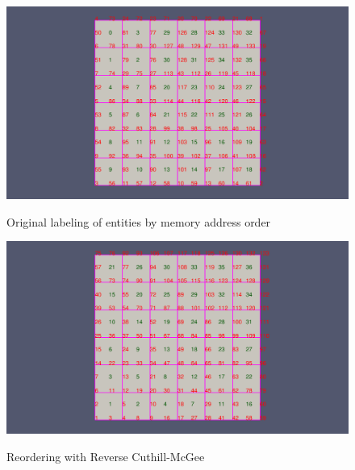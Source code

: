 \documentclass{article}
\begin{document}
\begin{figure}[h]
\caption{Original labeling of entities by memory address order}
{\includegraphics[width = 15cm ]{pre_a}}
\centering
\end{figure}

\begin{figure}[h]
\caption{Reordering with Reverse Cuthill-McGee}
{\includegraphics[width = 15cm ]{post_a}}
\centering
\end{figure}
\end{document}

